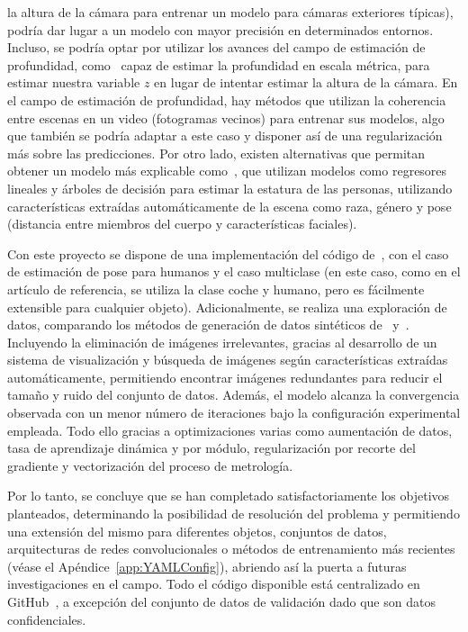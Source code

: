 la altura de la cámara para entrenar un modelo para cámaras exteriores típicas),
podría dar lugar a un modelo con mayor precisión en determinados entornos.
Incluso, se podría optar por utilizar los avances del campo de estimación de profundidad,
como~\cite{yang2024depthv2} capaz de estimar la profundidad en escala métrica,
para estimar nuestra variable $z$ en lugar de intentar estimar la altura de la cámara.
En el campo de estimación de profundidad, hay métodos que utilizan la coherencia entre escenas en un video
(fotogramas vecinos) para entrenar sus modelos, algo que también se podría adaptar a este caso
y disponer así de una regularización más sobre las predicciones.
Por otro lado, existen alternativas que permitan obtener un modelo
más explicable como~\cite{SAKINA2024765}, que utilizan
modelos como regresores lineales y árboles de decisión para estimar la estatura de las
personas, utilizando características extraídas automáticamente de la escena como raza, género
y pose (distancia entre miembros del cuerpo y características faciales).
\par
Con este proyecto se dispone de una implementación del código de~\cite{SVMIW}, con el
caso de estimación de pose para humanos y el caso multiclase (en este caso, como
en el artículo de referencia, se utiliza la clase coche y humano, pero es fácilmente
extensible para cualquier objeto).
Adicionalmente, se realiza una exploración de datos, comparando los métodos de generación
de datos sintéticos de~\cite{SVMIW} y~\cite{SPEC}. Incluyendo la eliminación de imágenes irrelevantes,
gracias al desarrollo de un sistema de visualización y búsqueda de imágenes según características
extraídas automáticamente, permitiendo encontrar imágenes redundantes para reducir el tamaño y ruido del conjunto de datos.
Además, el modelo alcanza la convergencia observada con un menor número de iteraciones bajo la configuración
experimental empleada. Todo ello gracias a optimizaciones varias como aumentación de datos,
tasa de aprendizaje dinámica y por módulo, regularización por recorte del gradiente
y vectorización del proceso de metrología.
\par
Por lo tanto, se concluye que se han completado satisfactoriamente los objetivos planteados, determinando la
posibilidad de resolución del problema y permitiendo una extensión del mismo para diferentes
objetos, conjuntos de datos, arquitecturas de redes convolucionales o métodos de entrenamiento más recientes
(véase el Apéndice~\ref{app:YAMLConfig}),
abriendo así la puerta a futuras investigaciones en el campo. Todo el código disponible está
centralizado en GitHub~, a excepción del conjunto
de datos de validación dado que son datos confidenciales.

